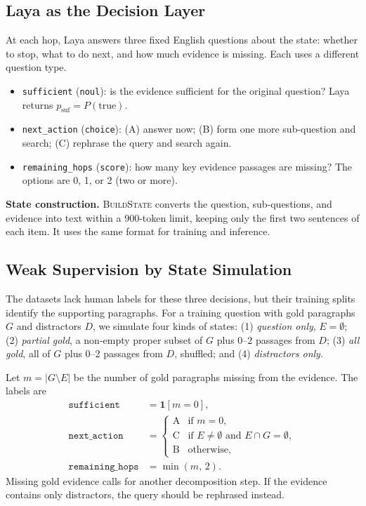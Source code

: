 \subsection{Laya as the Decision Layer}
\label{sec:method:laya}

At each hop, Laya answers three fixed English questions about the state: whether to stop,
what to do next, and how much evidence is missing. Each uses a different question type.

\begin{itemize}
  \item \texttt{sufficient} (\texttt{noul}): is the evidence sufficient for the original question? Laya returns $p_{\mathrm{suf}}=P(\text{true})$.
  \item \texttt{next\_action} (\texttt{choice}): (A) answer now; (B) form one more
        sub-question and search; (C) rephrase the query and search again.
  \item \texttt{remaining\_hops} (\texttt{score}): how many key evidence passages are
        missing? The options are 0, 1, or 2 (two or more).
\end{itemize}

\textbf{State construction.} \textsc{BuildState} converts the question, sub-questions,
and evidence into text within a 900-token limit, keeping only the first two sentences of
each item. It uses the same format for training and inference.

\subsection{Weak Supervision by State Simulation}
\label{sec:method:weak}

The datasets lack human labels for these three decisions, but their training splits
identify the supporting paragraphs. For a training question with gold paragraphs $G$ and
distractors $D$, we simulate four kinds of states: (1) \emph{question only}, $E=\emptyset$;
(2) \emph{partial gold}, a non-empty proper subset of $G$ plus 0--2 passages from $D$;
(3) \emph{all gold}, all of $G$ plus 0--2 passages from $D$, shuffled; and
(4) \emph{distractors only}.

Let $m=|G\setminus E|$ be the number of gold paragraphs missing from the evidence. The
labels are
\begin{align}
  \texttt{sufficient}      &= \mathbf{1}[m=0], \\
  \texttt{next\_action}    &=
    \begin{cases}
      \text{A} & \text{if } m=0,\\
      \text{C} & \text{if } E\neq\emptyset \text{ and } E\cap G=\emptyset,\\
      \text{B} & \text{otherwise},
    \end{cases} \\
  \texttt{remaining\_hops} &= \min(m,\,2).
\end{align}
Missing gold evidence calls for another decomposition step. If the evidence contains only
distractors, the query should be rephrased instead.

